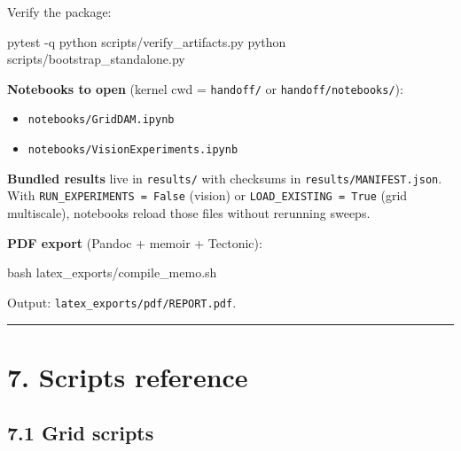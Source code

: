 \documentclass[
  11pt,
]{memoir}
\newenvironment{Shaded}{}{}
\newcommand{\AttributeTok}[1]{\textcolor[rgb]{0.49,0.56,0.16}{#1}}
\newcommand{\ExtensionTok}[1]{#1}
\newcommand{\FunctionTok}[1]{\textcolor[rgb]{0.02,0.16,0.49}{#1}}
\newcommand{\NormalTok}[1]{#1}
\providecommand{\tightlist}{%
  \setlength{\itemsep}{0pt}\setlength{\parskip}{0pt}}
\begin{document}
Verify the package:

\begin{Shaded}
\begin{Highlighting}[]
\ExtensionTok{pytest} \AttributeTok{{-}q}
\ExtensionTok{python}\NormalTok{ scripts/verify\_artifacts.py}
\ExtensionTok{python}\NormalTok{ scripts/bootstrap\_standalone.py}
\end{Highlighting}
\end{Shaded}

\textbf{Notebooks to open} (kernel cwd = \texttt{handoff/} or
\texttt{handoff/notebooks/}):

\begin{itemize}
\tightlist
\item
  \texttt{notebooks/GridDAM.ipynb}
\item
  \texttt{notebooks/VisionExperiments.ipynb}
\end{itemize}

\textbf{Bundled results} live in \texttt{results/} with checksums in
{\ttfamily\nolinkurl{results/MANIFEST.json}}. With \texttt{RUN\_EXPERIMENTS\ =\ False}
(vision) or \texttt{LOAD\_EXISTING\ =\ True} (grid multiscale),
notebooks reload those files without rerunning sweeps.

\textbf{PDF export} (Pandoc + memoir + Tectonic):

\begin{Shaded}
\begin{Highlighting}[]
\FunctionTok{bash}\NormalTok{ latex\_exports/compile\_memo.sh}
\end{Highlighting}
\end{Shaded}

Output: \texttt{latex\_exports/pdf/REPORT.pdf}.

\begin{center}\rule{0.5\linewidth}{0.5pt}\end{center}

\section{7. Scripts reference}\label{scripts-reference}

\subsection{7.1 Grid scripts}\label{grid-scripts}
\end{document}
